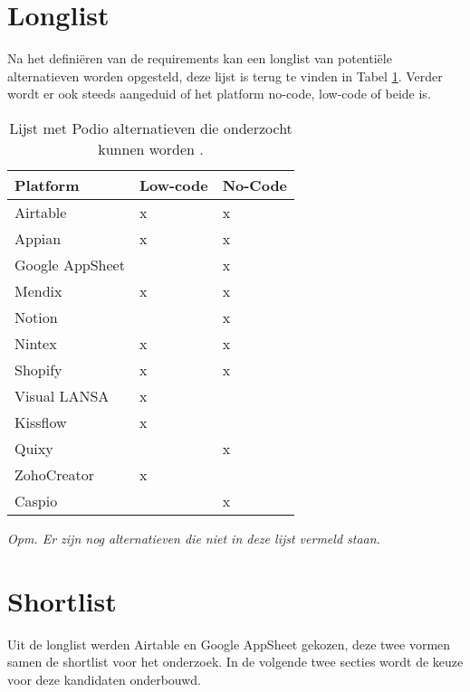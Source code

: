 \section{Longlist}
\label{sec:long_list}

Na het definiëren van de requirements kan een longlist van potentiële alternatieven worden opgesteld, deze lijst is terug te vinden in Tabel \ref{tab:Tabel 3}. Verder wordt er ook steeds aangeduid of het platform no-code, low-code of beide is. \\

\begin{table}[h]
    \centering
    \caption{\label{tab:Tabel 3} Lijst met Podio alternatieven die onderzocht kunnen worden \autocite{Tasmia2022}.}
    \begin{tabular}{ | p{5cm} | p{2cm} | p{2cm} | }
        \hline
        \textbf{Platform}   & \textbf{Low-code} & \textbf{No-Code} \\
        \hline\hline
        Airtable            & x    & x \\
        Appian              & x    & x \\
        Google AppSheet     &      & x \\
        Mendix              & x    & x \\
        Notion              &      & x \\
        Nintex              & x    & x \\
        Shopify             & x    & x \\
        Visual LANSA        & x    &   \\
        Kissflow            & x    &   \\
        Quixy               &      & x \\
        ZohoCreator         & x    &   \\
        Caspio              &      & x \\
        \hline
    \end{tabular}
    
    {\raggedright \textit{Opm. Er zijn nog alternatieven die niet in deze lijst vermeld staan.} \par}
\end{table}

\section{Shortlist}

Uit de longlist werden Airtable en Google AppSheet gekozen, deze twee vormen samen de shortlist voor het onderzoek. In de volgende twee secties wordt de keuze voor deze kandidaten onderbouwd. 

